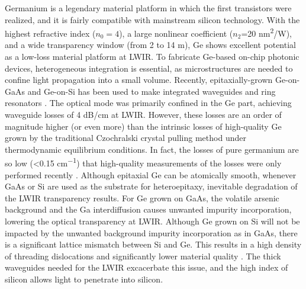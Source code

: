 \documentclass[fleqn,10pt,twocolumn]{wlscirep}
\begin{document}
Germanium is a legendary material platform in which the first transistors were realized, and it is fairly compatible with mainstream silicon technology\cite{carrollDirectGapGainOptical2012}. With the highest refractive index ($n_0=4$), a large nonlinear coefficient ($n_2$=20 \si{nm^2/W}), and a wide transparency window (from 2 to 14 \micro m), Ge shows excellent potential as a low-loss material platform at LWIR\cite{zhangNonlinearGroupIV2014,hon2011third,soref2010mid}. To fabricate Ge-based on-chip photonic devices, heterogeneous integration is essential, as microstructures are needed to confine light propagation into a small volume. Recently, epitaxially-grown Ge-on-GaAs and Ge-on-Si has been used to make integrated waveguides and ring resonators \cite{chang2012low,brun2014low,nedeljkovic2017germanium,liaoLowLossGeonGaAsPlatform2017,gallacher2018low,montesinos2020ge,kozakGermaniumonsiliconWaveguidesLongwave2021}. The optical mode was primarily confined in the Ge part, achieving waveguide losses of 4 dB/cm at LWIR. However, these losses are an order of magnitude higher (or even more) than the intrinsic losses of high-quality Ge grown by the traditional Czochralski crystal pulling method under thermodynamic equilibrium conditions. In fact, the losses of pure germanium are so low (<0.15 \si{cm^{-1}}) that high-quality measurements of the losses were only performed recently \cite{leeLongwaveInfraredAbsorption2020}. Although epitaxial Ge can be atomically smooth, whenever GaAs or Si are used as the substrate for heteroepitaxy, inevitable degradation of the LWIR transparency results. For Ge grown on GaAs, the volatile arsenic background and the Ga interdiffusion causes unwanted impurity incorporation, lowering the optical transparency at LWIR\cite{bai2012photoluminescence}. Although Ge grown on Si will not be impacted by the unwanted background impurity incorporation as in GaAs, there is a significant lattice mismatch between Si and Ge. This results in a high density of threading dislocations and significantly lower material quality \cite{eaglesham1991low}. The thick waveguides needed for the LWIR excacerbate this issue, and the high index of silicon allows light to penetrate into silicon.
\end{document}
